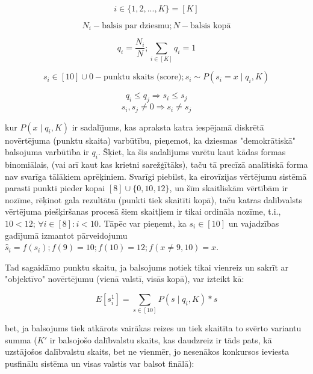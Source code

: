 \documentclass[12pt, a4paper]{article}
\numberwithin{equation}{section} %
\begin{document}
\begin{equation}
 i \in \lbrace 1,2,...,K \rbrace = [K]
\end{equation}

\begin{equation}
    N_i - \text{balsis par dziesmu}; N - \text{balsis kopā}
\end{equation}

\begin{equation}
    q_i = \frac{N_i}{N}; \sum_{i\in[K]} q_i = 1
\end{equation}

\begin{equation}
    s_i \in [10] \cup 0 - \text{punktu skaits (score)}; s_i \sim P(s_i = x \mid q_i, K)
\end{equation}

\begin{equation}
    q_i \leq q_j \Rightarrow s_i \leq s_j
\end{equation}
\begin{equation}
    s_i, s_j \neq 0 \Rightarrow s_i \neq s_j
\end{equation}


kur $P(x \mid q_i, K)$ ir sadalījums, kas apraksta katra iespējamā diskrētā novērtējuma (punktu skaita) varbūtību, pieņemot, ka dziesmas "demokrātiskā" balsojuma varbūtība ir $q_i$. Šķiet, ka šis sadalījums varētu kaut kādas formas binomiālais, (vai arī kaut kas krietni sarežģītāks), taču tā precīzā analītiskā forma nav svarīga tālākiem aprēķiniem. Svarīgi piebilst, ka eirovīzijas vērtējumu sistēmā parasti punkti pieder kopai $[8] \cup \lbrace 0, 10, 12 \rbrace$, un šīm skaitliskām vērtībām ir nozīme, rēķinot gala rezultātu (punkti tiek skaitīti kopā), taču katras dalībvalsts vērtējuma piešķiršanas procesā šiem skaitļiem ir tikai ordināla nozīme, t.i., $10<12$; $\forall i \in [8]: i < 10$. Tāpēc var pieņemt, ka $s_i \in [10]$ un vajadzības gadījumā izmantot pārveidojumu $\hat s_i = f(s_i); f(9)=10;f(10)=12;f(x \neq 9,10)=x$.

Tad sagaidāmo punktu skaitu, ja balsojums notiek tikai vienreiz un sakrīt ar "objektīvo" novērtējumu (vienā valstī, visās kopā), var izteikt kā:

\begin{equation}
    E[s_i^1] = \sum_{s\in[10]}P(s\mid q_i, K)*s
\end{equation}

bet, ja balsojums tiek atkārots vairākas reizes un tiek skaitīta to svērto variantu summa ($K'$ ir balsojošo dalībvalstu skaits, kas daudzreiz ir tāds pats, kā uzstājošos dalībvalstu skaits, bet ne vienmēr, jo nesenākos konkursos ieviesta pusfinālu sistēma un visas valstis var balsot finālā):
\end{document}
